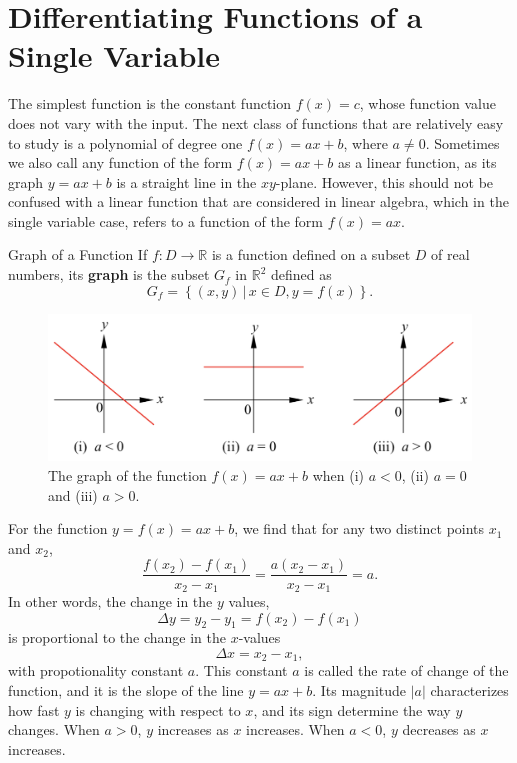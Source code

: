  
 
 

\chapter{Differentiating Functions of a Single Variable}\label{ch3}
The simplest function is the constant function $f(x)=c$, whose function value does not vary with the input. The next  class  of functions that are relatively easy to study is a polynomial of degree one $f(x)=ax+b$, where $a\neq 0$. Sometimes we also call  any function of the form $f(x)=ax+b$ as a linear function, as its graph $y=ax+b$ is a straight line in the $xy$-plane. However, this should not be confused with a linear function that are considered in linear algebra, which in the single variable case, refers to a function of the form $f(x)=ax$. 

\begin{definition}{Graph of a Function}
If $f:D\rightarrow\mathbb{R}$ is a function defined on a subset $D$ of real numbers, its {\bf graph} is the subset $G_f$ in $\mathbb{R}^2$ defined as
\[G_f=\left\{(x,y)\,|\, x\in D, y=f(x)\right\}.\]
\end{definition}

 \begin{figure}[ht]
\centering
\includegraphics[scale=0.25]{Picture17.png}
\caption{  The graph of the function $f(x)=ax+b$ when (i) $a<0$, (ii) $a=0$ and (iii) $a>0$.\fa}\label{figure17}
\end{figure}

  For the function $y=f(x)=ax+b$,  we find that for any two distinct points $x_1$ and $x_2$,
\[\frac{f(x_2)-f(x_1)}{x_2-x_1}=\frac{a(x_2-x_1)}{x_2-x_1}=a.\]
In other words, the change in the $y$ values,
\[\Delta y=y_2-y_1=f(x_2)-f(x_1)\]
is proportional to the change in the $x$-values
\[\Delta x=x_2-x_1,\] with propotionality constant $a$. This constant $a$ is called the rate of change of the function, and it is the slope of the line $y=ax+b$. Its magnitude $|a|$ characterizes how fast $y$ is changing with respect to $x$, and its sign determine the way $y$ changes. When $a>0$,  $y$ increases as   $x$ increases. When $a<0$, $y$ decreases as $x$ increases. 

